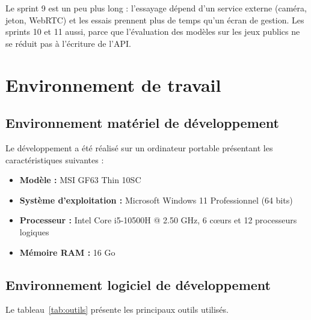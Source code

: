 Le sprint 9 est un peu plus long : l'essayage dépend d'un service externe (caméra, jeton, WebRTC) et les essais prennent plus de temps qu'un écran de gestion. Les sprints 10 et 11 aussi, parce que l'évaluation des modèles sur les jeux publics ne se réduit pas à l'écriture de l'API.

\section{Environnement de travail}
\subsection{Environnement matériel de développement}
Le développement a été réalisé sur un ordinateur portable présentant les caractéristiques suivantes :
\begin{itemize}
    \item \textbf{Modèle :} MSI GF63 Thin 10SC
    \item \textbf{Système d'exploitation :} Microsoft Windows 11 Professionnel (64 bits)
    \item \textbf{Processeur :} Intel Core i5-10500H @ 2.50 GHz, 6 cœurs et 12 processeurs logiques
    \item \textbf{Mémoire RAM :} 16 Go
   
\end{itemize}

\subsection{Environnement logiciel de développement}

Le tableau~\ref{tab:outils} présente les principaux outils utilisés.

\vspace{0.3em}

